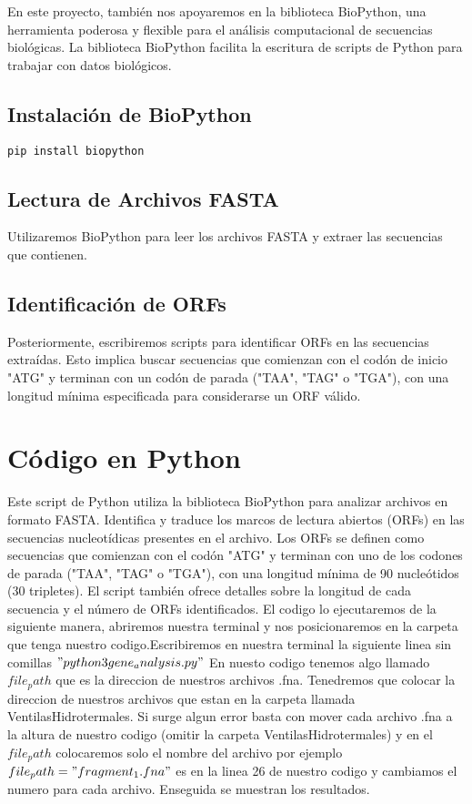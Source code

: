 En este proyecto, también nos apoyaremos en la biblioteca BioPython, una herramienta poderosa y flexible para el análisis computacional de secuencias biológicas. La biblioteca BioPython facilita la escritura de scripts de Python para trabajar con datos biológicos.

\subsection*{Instalación de BioPython}

\begin{verbatim}
pip install biopython
\end{verbatim}

\subsection*{Lectura de Archivos FASTA}

Utilizaremos BioPython para leer los archivos FASTA y extraer las secuencias que contienen.

\subsection*{Identificación de ORFs}

Posteriormente, escribiremos scripts para identificar ORFs en las secuencias extraídas. Esto implica buscar secuencias que comienzan con el codón de inicio "ATG" y terminan con un codón de parada ("TAA", "TAG" o "TGA"), con una longitud mínima especificada para considerarse un ORF válido.


\section*{Código en Python}

Este script de Python utiliza la biblioteca BioPython para analizar archivos en formato FASTA. Identifica y traduce los marcos de lectura abiertos (ORFs) en las secuencias nucleotídicas presentes en el archivo. Los ORFs se definen como secuencias que comienzan con el codón "ATG" y terminan con uno de los codones de parada ("TAA", "TAG" o "TGA"), con una longitud mínima de 90 nucleótidos (30 tripletes). El script también ofrece detalles sobre la longitud de cada secuencia y el número de ORFs identificados.
El codigo lo ejecutaremos de la siguiente manera, abriremos nuestra terminal y nos posicionaremos en la carpeta que tenga nuestro codigo.Escribiremos en nuestra terminal la siguiente linea sin comillas $"python3 gene_analysis.py"$
En nuesto codigo tenemos algo llamado $file_path$ que es la direccion de nuestros archivos .fna. Tenedremos que colocar la direccion de nuestros archivos que estan en la carpeta llamada VentilasHidrotermales. Si surge algun error basta con mover cada archivo .fna a la altura de nuestro codigo (omitir la carpeta VentilasHidrotermales) y en el $file_path$ colocaremos solo el nombre del archivo por ejemplo $file_path = "fragment_1.fna"$ es en la linea 26 de nuestro codigo y cambiamos el numero para cada archivo. Enseguida se muestran los resultados.



